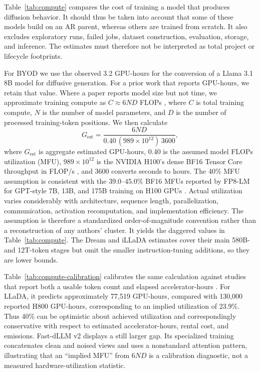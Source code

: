 \documentclass{article}
\begin{document}
Table~\ref{tab:compute} compares the cost of training a model that produces diffusion behavior. It should thus be taken into account that some of these models build on an AR parent, whereas others are trained from scratch. It also excludes exploratory runs, failed jobs, dataset construction, evaluation, storage, and inference. The estimates must therefore not be interpreted as total project or lifecycle footprints.

For BYOD we use the observed 3.2 GPU-hours for the conversion of a Llama 3.1 8B model for diffusive generation. For a prior work that reports GPU-hours, we retain that value. Where a paper reports model size but not time, we approximate training compute as $C\approx6ND$ FLOPs \citep{hoffmann2022chinchilla}, where $C$ is total training compute, $N$ is the number of model parameters, and $D$ is the number of processed training-token positions. We then calculate
\begin{equation}
G_{\mathrm{est}}=\frac{6ND}{0.40\,(989\times10^{12})\,3600},
\end{equation}
where $G_{\mathrm{est}}$ is aggregate estimated GPU-hours, 0.40 is the assumed model FLOPs utilization (MFU), $989\times10^{12}$ is the NVIDIA H100's dense BF16 Tensor Core throughput in FLOP/s \citep{nvidiaH100}, and 3600 converts seconds to hours. The 40\% MFU assumption is consistent with the 39.0--45.0\% BF16 MFUs reported by FP8-LM for GPT-style 7B, 13B, and 175B training on H100 GPUs \citep{peng2023fp8lm}. Actual utilization varies considerably with architecture, sequence length, parallelization, communication, activation recomputation, and implementation efficiency. The assumption is therefore a standardized order-of-magnitude convention rather than a reconstruction of any authors' cluster. It yields the daggered values in Table~\ref{tab:compute}. The Dream and iLLaDA estimates cover their main 580B- and 12T-token stages but omit the smaller instruction-tuning additions, so they are lower bounds.

Table~\ref{tab:compute-calibration} calibrates the same calculation against studies that report both a usable token count and elapsed accelerator-hours \citep{nie2025llada,wu2025fastdllmv2}. For LLaDA, it predicts approximately 77,519 GPU-hours, compared with 130,000 reported H800 GPU-hours, corresponding to an implied utilization of 23.9\%. Thus 40\% can be optimistic about achieved utilization and correspondingly conservative with respect to estimated accelerator-hours, rental cost, and emissions. Fast-dLLM v2 displays a still larger gap. Its specialized training concatenates clean and noised views and uses a nonstandard attention pattern, illustrating that an ``implied MFU'' from $6ND$ is a calibration diagnostic, not a measured hardware-utilization statistic.
\end{document}
